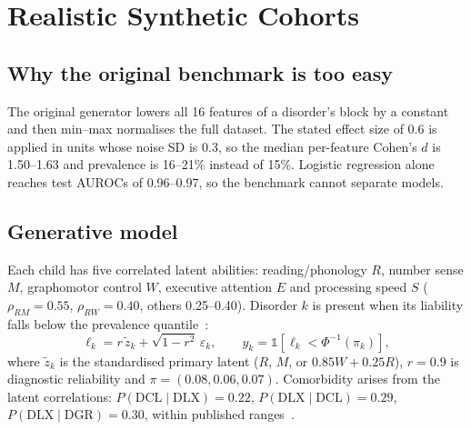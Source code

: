 \documentclass[conference]{IEEEtran}
\begin{document}
\section{Realistic Synthetic Cohorts}\label{sec:cohort}
\subsection{Why the original benchmark is too easy}
The original generator lowers all 16 features of a disorder's block by a constant and
then min--max normalises the full dataset. The stated effect size of 0.6 is applied
in units whose noise SD is 0.3, so the median per-feature Cohen's $d$ is 1.50--1.63
and prevalence is 16--21\% instead of 15\%. Logistic regression alone reaches test
AUROCs of 0.96--0.97, so the benchmark cannot separate models.

\subsection{Generative model}
Each child has five correlated latent abilities: reading/phonology $R$, number sense
$M$, graphomotor control $W$, executive attention $E$ and processing speed $S$
($\rho_{RM}{=}0.55$, $\rho_{RW}{=}0.40$, others 0.25--0.40). Disorder $k$ is present
when its liability falls below the prevalence quantile~\cite{falconer1965}:
\begin{equation}
\ell_k = r\,\tilde z_k + \sqrt{1-r^2}\,\varepsilon_k,\qquad y_k=\mathbb{1}[\ell_k<\Phi^{-1}(\pi_k)],
\end{equation}
where $\tilde z_k$ is the standardised primary latent ($R$, $M$, or $0.85W{+}0.25R$),
$r{=}0.9$ is diagnostic reliability and $\pi{=}(0.08,0.06,0.07)$. Comorbidity arises
from the latent correlations: $P(\text{DCL}\mid\text{DLX}){=}0.22$,
$P(\text{DLX}\mid\text{DCL}){=}0.29$, $P(\text{DLX}\mid\text{DGR}){=}0.30$, within
published ranges~\cite{willcutt2013,landerl2010}.
\end{document}
